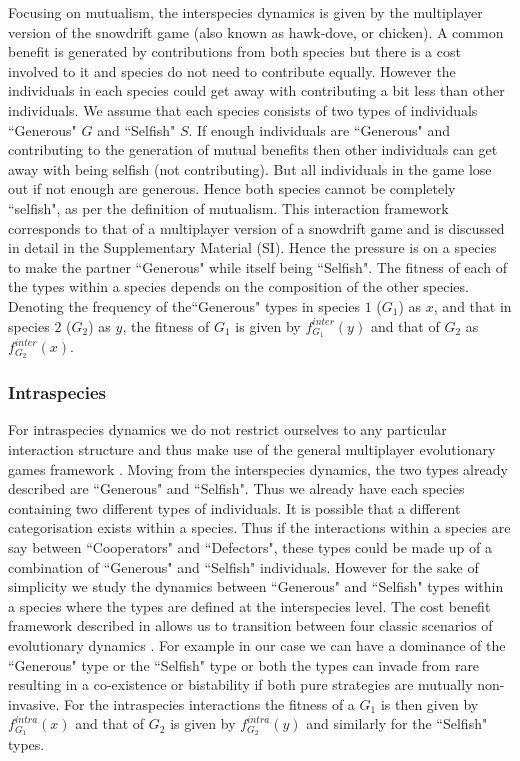 \documentclass[12pt]{article}
\begin{document}
Focusing on mutualism, the interspecies dynamics is given by the multiplayer version of the snowdrift game \citep{bergstrom:PNAS:2003,souza:JTB:2009,gokhale:PRSB:2012} (also known as hawk-dove, or chicken).
A common benefit is generated by contributions from both species but there is a cost involved to it and species do not need to contribute equally. 
However the individuals in each species could get away with contributing a bit less than other individuals.
We assume that each species consists of two types of individuals ``Generous" $G$ and ``Selfish" $S$. 
If enough individuals are ``Generous" and contributing to the generation of mutual benefits then other individuals can get away with being selfish (not contributing). 
But all individuals in the game lose out if not enough are generous. Hence both species cannot be completely ``selfish", as per the definition of mutualism.
This interaction framework corresponds to that of a multiplayer version of a snowdrift game and is discussed in detail in the Supplementary Material (SI).
Hence the pressure is on a species to make the partner ``Generous" while itself being ``Selfish".
The fitness of each of the types within a species depends on the composition of the other species.
Denoting the frequency of the``Generous" types in species $1$ ($G_1$) as $x$, and that in species $2$ ($G_2$) as $y$, the fitness of $G_1$  is given by $f^{inter}_{G_1} (y)$ and that of $G_2$ as $f^{inter}_{G_2} (x)$. 

\subsubsection{Intraspecies}

For intraspecies dynamics we do not restrict ourselves to any particular interaction structure and thus make use of the general multiplayer evolutionary games framework \citep{gokhale:PNAS:2010,gokhale:DGAA:2014}.
Moving from the interspecies dynamics, the two types already described are ``Generous" and ``Selfish".
Thus we already have each species containing two different types of individuals.
It is possible that a different categorisation exists within a species.
Thus if the interactions within a species are say between ``Cooperators" and ``Defectors", these types could be made up of a combination of ``Generous" and ``Selfish" individuals.
However for the sake of simplicity we study the dynamics between ``Generous" and ``Selfish" types within a species where the types are defined at the interspecies level.
The cost benefit framework described in \citep{eshel:AmNat:1988,hauert:JTB:2006a}
 allows us to transition between four classic scenarios of evolutionary dynamics \citep{nowak:Science:2004}.
For example in our case we can have a dominance of the ``Generous" type or the ``Selfish" type or both the types can invade from rare resulting in a co-existence or bistability if both pure strategies are mutually non-invasive.
For the intraspecies interactions the fitness of a $G_1$ is then given by $f^{intra}_{G_1} (x)$ and that of $G_2$ is given by $f^{intra}_{G_2} (y)$ and similarly for the ``Selfish" types.
\end{document}
